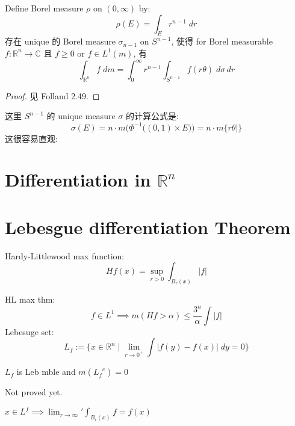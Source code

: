 \documentclass[lang=cn,11pt]{elegantbook}
\begin{document}
\begin{theorem}
Define Borel measure $\rho$ on $(0,\infty)$ by: \[
\rho(E) = \int_E r^{n-1} \; dr
\]
存在 unique 的 Borel measure $\sigma_{n-1}$ on $S^{n-1}$, 使得 for Borel measurable $f:\mathbb{R}^n \to \mathbb{C}$ 且 $f\geq 0$ or $f\in L^1(m)$, 有 \[
\int_{\mathbb{R}^n} f \; dm = \int_0^{\infty}  r^{n-1} \int_{S^{n-1}} f(r\theta) \; d\sigma \, dr
\]
\end{theorem}
\begin{proof}
    见 Folland 2.49.
\end{proof}

\begin{remark}

这里 $S^{n-1}$ 的 unique measure $\sigma$ 的计算公式是: \[
\sigma(E) = n\cdot m\bigg(\Phi^{-1}\big( (0,1)\times E  \big)\bigg) = n\cdot m\{r\theta \mid  \}
\]
这很容易直观: 
\end{remark}


\chapter{Differentiation in $\mathbb{R}^n$}


















\chapter{Lebesgue differentiation Theorem}

Hardy-Littlewood max function: \[
Hf(x) = \sup_{r > 0} \int_{B_r(x)} |f| 
\]

HL max thm: \[
f \in L^1 \implies m(Hf > \alpha) \leq \frac{3^n}{\alpha} \int |f| 
\]
Lebesuge set: \[
L_f := \{ x \in \mathbb{R}^n \mid \lim_{r \to 0^+} \int |f(y) - f(x) | \; dy = 0   \}
\]


\begin{theorem}
$L_f$ is Leb mble and $m({L_f}^c) = 0$ 
\end{theorem}
Not proved yet.

\begin{corollary}
    $x \in L^f \implies \lim_{r\to \infty} \prime\int_{B_r(x)} f= f(x)$
\end{corollary}
\end{document}
